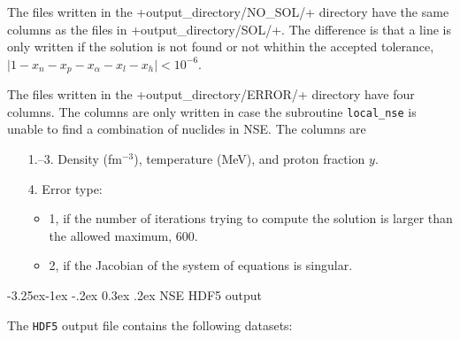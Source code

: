 \documentclass[letterpaper,11pt]{refart}
\makeatletter
\renewcommand\subsubsection{\@startsection{subsubsection}{3}{\z@}%
                           {-3.25ex\@plus -1ex \@minus -.2ex}%
                           {0.3ex \@plus .2ex}%
                           {\normalfont\normalsize\bf\fontsize{11}{13}\selectfont}}
\makeatother
\begin{document}
The files written in the \verbfile+output_directory/NO_SOL/+ directory
have the same columns as the files in \verbfile+output_directory/SOL/+.
The difference is that a line is only written if the solution is not found 
or not whithin the accepted tolerance, 
$\vert1-x_n-x_p-x_\alpha-x_l-x_h\vert < 10^{-6}$.


The files written in the
\verbfile+output_directory/ERROR/+ directory have four columns. The
columns are only written in case the subroutine \texttt{local\_nse} is
unable to find a combination of nuclides in NSE. The columns are

\begin{enumerate}
 \item[1.--3.] Density (fm$^{-3}$), temperature (MeV), and proton fraction $y$. 
 \item[4.] Error type:
 \begin{itemize}
  \item 1, if the number of iterations trying to compute the solution
    is larger than the allowed maximum, 600.
  \item 2, if the Jacobian of the system of equations is singular. 
 \end{itemize}
\end{enumerate}


\subsubsection{NSE HDF5 output}\label{sssec:NSE_HDF5}

The \verb|HDF5| output file contains the following datasets:
\end{document}
